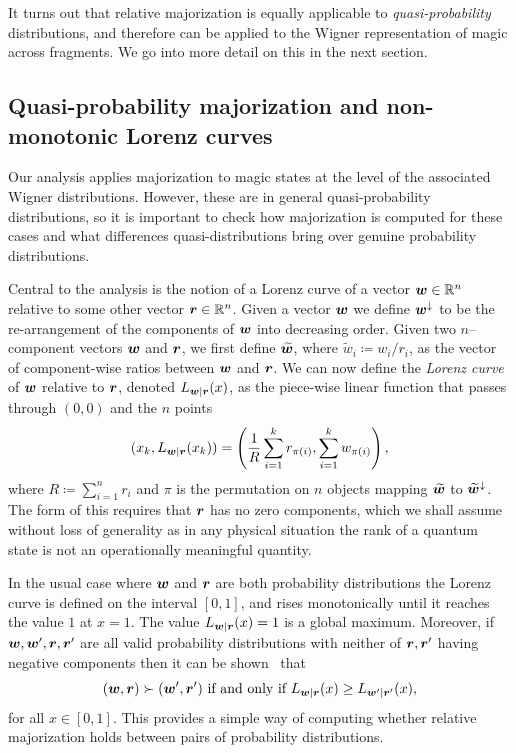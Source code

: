\documentclass[pra,
aps,
twocolumn,
superscriptaddress,
groupedaddress,
nofootinbib,
reprint
]{revtex4-1}
\begin{document}
It turns out that relative majorization is equally applicable to \emph{quasi-probability} distributions, and therefore can be applied to the Wigner representation of magic across fragments. We go into more detail on this in the next section.

\subsection{Quasi-probability majorization and non-monotonic Lorenz curves}
\label{sec:lc}

Our analysis applies majorization to magic states at the level of the associated Wigner distributions. However, these are in general quasi-probability distributions, so it is important to check how majorization is computed for these cases and what differences quasi-distributions bring over genuine probability distributions.

Central to the analysis is the notion of a Lorenz curve of a vector $\boldsymbol{w} \in \mathbb{R}^n$ relative to some other vector $\boldsymbol{r} \in \mathbb{R}^n$. Given a vector $\boldsymbol{w}$ we define $\boldsymbol{w}^\downarrow$ to be the re-arrangement of the components of $\boldsymbol{w}$ into decreasing order. Given two $n$--component vectors $\boldsymbol{w}$ and $\boldsymbol{r}$, we first define $\widetilde{\boldsymbol{w}}$, where $\widetilde{w}_i \coloneqq w_i/r_i$, as the vector of component-wise ratios between $\boldsymbol{w}$ and $\boldsymbol{r}$.
We can now define the \emph{Lorenz curve} of $\boldsymbol{w}$ relative to $\boldsymbol{r}$, denoted $L_{\boldsymbol{w}|\boldsymbol{r}}(x)$, as the piece-wise linear function that passes through $(0,0)$ and the $n$ points
\begin{equation}
\label{eq:lc}
        (x_k,L_{\boldsymbol{w}|\boldsymbol{r}}(x_k)) =\left( \frac{1}{R}\sum_{i=1}^k r_{\pi(i)}, \sum_{i=1}^k w_{\pi(i)} \right),
\end{equation}
where $R\coloneqq \sum_{i=1}^n r_i$ and $\pi$ is the permutation on $n$ objects mapping $\widetilde{\boldsymbol{w}}$ to $\widetilde{\boldsymbol{w}}^{\downarrow}$. The form of this requires that $\boldsymbol{r}$ has no zero components, which we shall assume without loss of generality as in any physical situation the rank of a quantum state is not an operationally meaningful quantity.

In the usual case where $\boldsymbol{w}$ and $\boldsymbol{r}$ are both probability distributions the Lorenz curve is defined on the interval $[0,1]$, and rises monotonically until it reaches the value $1$ at $x=1$. The value $L_{\boldsymbol{w}|\boldsymbol{r}}(x) = 1$ is a global maximum. Moreover, if $\boldsymbol{w}, \boldsymbol{w}', \boldsymbol{r}, \boldsymbol{r}'$ are all valid probability distributions with neither of $\boldsymbol{r},\boldsymbol{r}'$ having negative components then it can be shown~\cite{ruch_mixing_1978} that
\begin{equation}
(\boldsymbol{w}, \boldsymbol{r}) \succ (\boldsymbol{w}', \boldsymbol{r}') \mbox{ if and only if } L_{\boldsymbol{w} |\boldsymbol{r}}(x) \ge L_{\boldsymbol{w}' |\boldsymbol{r}'}(x),
\end{equation}
for all $x \in [0,1]$.
This provides a simple way of computing whether relative majorization holds between pairs of probability distributions.
\end{document}

